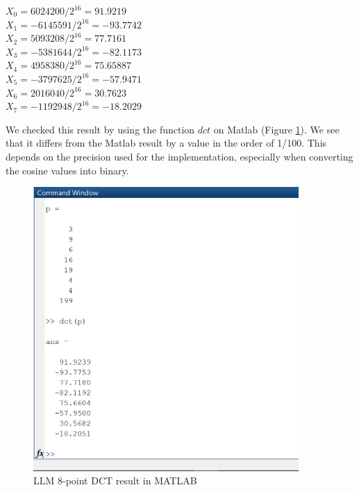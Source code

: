     \begin{center}
    	$ X_{0}=6024200/2^{16}=91.9219$\\
    	$ X_{1}=-6145591/2^{16}=-93.7742 $\\
    	$ X_{2}=5093208/2^{16}= 77.7161$ \\
    	$ X_{3}=-5381644/2^{16}= -82.1173$ \\
    	$ X_{4}=4958380/2^{16}= 75.65887$ \\
    	$X_{5}=-3797625/2^{16}=-57.9471$\\
    	$X_{6}=2016040/2^{16}=30.7623$\\
    	$X_{7}=-1192948/2^{16}=-18.2029$\\
    \end{center}
     We checked this result by using the function $ dct $ on Matlab (Figure \ref{fig:dct8_res_mat}).
     We see that it differs from the Matlab result by a value in the order of 1/100. This depends on the precision used for the implementation, especially when converting the cosine values into binary.
     
     
     
     
     
     \begin{figure}[h!]
     	\centering	
     	\includegraphics[width=0.9\textwidth]{imm/dct/dct8_matlab.png}  
     	\caption{LLM 8-point DCT result in MATLAB} 
     	\label{fig:dct8_res_mat}
     \end{figure}
     
